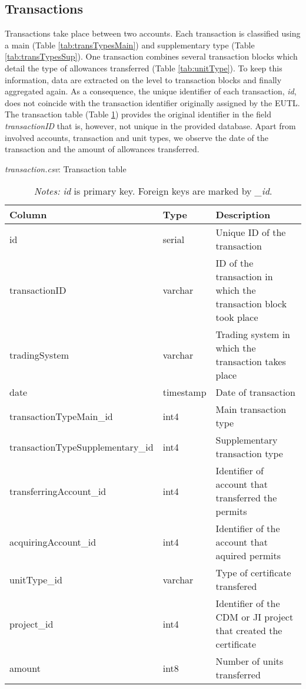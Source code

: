 \documentclass[authoryear]{elsarticle}
\begin{document}
\subsection{Transactions}
Transactions take place between two accounts. Each transaction is classified using a main (Table \ref{tab:transTypesMain}) and supplementary type (Table \ref{tab:transTypesSup}). One transaction combines several transaction blocks which detail the type of allowances transferred (Table \ref{tab:unitType}). To keep this information, data are extracted on the level to transaction blocks and finally aggregated again. As a consequence, the unique identifier of each transaction, \textit{id}, does not coincide with the transaction identifier originally assigned by the EUTL. The transaction table (Table \ref{tab:tbl_transaction}) provides the original identifier in the field \textit{transactionID} that is, however, not unique in the provided database. Apart from involved accounts, transaction and unit types, we observe the date of the transaction and the amount of allowances transferred. 

\begin{table}[htbp]\scriptsize
	\caption{\textit{transaction.csv}: Transaction table}\label{tab:tbl_transaction}
	\centering
	\begin{tabular*}{\textwidth}{@{}@{\extracolsep{\fill}} lll @{}}
		\toprule
		\toprule
		\textbf{Column} & \textbf{Type} & \textbf{Description} \\
		\midrule
		id    & serial & Unique ID of the transaction  \\
		transactionID & varchar & ID of the transaction in which the transaction block took place \\
		tradingSystem & varchar & Trading system in which the transaction takes place\\
		date  & timestamp & Date of transaction \\
		transactionTypeMain\_id & int4  & Main transaction type \\
		transactionTypeSupplementary\_id & int4  & Supplementary transaction type \\
		transferringAccount\_id & int4  & Identifier of account that transferred the permits \\
		acquiringAccount\_id & int4  & Identifier of the account that aquired permits \\
		unitType\_id & varchar & Type of certificate transfered \\
		project\_id & int4  & Identifier of the CDM or JI project that created the certificate \\
		amount & int8  & Number of units transferred \\
		\bottomrule
		\bottomrule
	\end{tabular*}%
	\vspace{-3ex}
\caption*{\footnotesize \emph{Notes:} \textit{id} is primary key. Foreign keys are marked by \textit{\_id}.}
\vspace{0ex}
\end{table}
\end{document}
